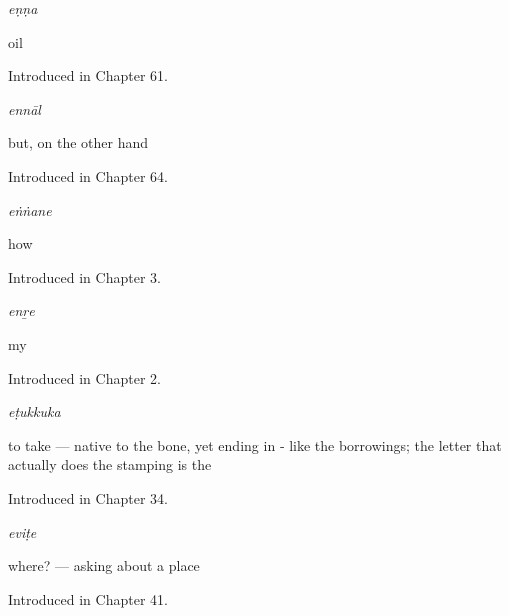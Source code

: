 \noindent\begin{minipage}[t]{\linewidth}
\raggedright
\textbf{}\enspace\emph{eṇṇa}\par
\small oil\par
\footnotesize Introduced in Chapter 61.
\end{minipage}\par\medskip

\noindent\begin{minipage}[t]{\linewidth}
\raggedright
\textbf{}\enspace\emph{ennāl}\par
\small but, on the other hand\par
\footnotesize Introduced in Chapter 64.
\end{minipage}\par\medskip

\noindent\begin{minipage}[t]{\linewidth}
\raggedright
\textbf{}\enspace\emph{eṅṅane}\par
\small how\par
\footnotesize Introduced in Chapter 3.
\end{minipage}\par\medskip

\noindent\begin{minipage}[t]{\linewidth}
\raggedright
\textbf{}\enspace\emph{enṟe}\par
\small my\par
\footnotesize Introduced in Chapter 2.
\end{minipage}\par\medskip

\noindent\begin{minipage}[t]{\linewidth}
\raggedright
\textbf{}\enspace\emph{eṭukkuka}\par
\small to take — native to the bone, yet ending in ‑ like the borrowings; the letter that actually does the stamping is the \par
\footnotesize Introduced in Chapter 34.
\end{minipage}\par\medskip

\noindent\begin{minipage}[t]{\linewidth}
\raggedright
\textbf{}\enspace\emph{eviṭe}\par
\small where? — asking about a place\par
\footnotesize Introduced in Chapter 41.
\end{minipage}\par\medskip

